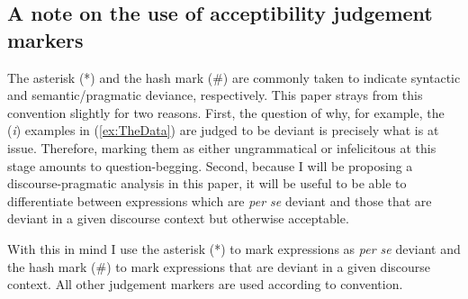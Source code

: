 \documentclass[
	letterpaper,
]{article}
\begin{document}
\subsection{A note on the use of acceptibility judgement markers}
The asterisk (*) and the hash mark (\#) are commonly taken to indicate syntactic and semantic/pragmatic deviance, respectively.
This paper strays from this convention slightly for two reasons.
First, the question of why, for example, the (\textit{i}) examples in (\ref{ex:TheData}) are judged to be deviant is precisely what is at issue.
Therefore, marking them as either ungrammatical or infelicitous at this stage amounts to question-begging.
Second, because I will be proposing a discourse-pragmatic analysis in this paper, it will be useful to be able to differentiate between expressions which are \textit{per se} deviant and those that are deviant in a given discourse context but otherwise acceptable.

With this in mind I use the asterisk (*) to mark expressions as \textit{per se} deviant and the hash mark (\#) to mark expressions that are deviant in a given discourse context. 
All other judgement markers are used according to convention.
\end{document}
